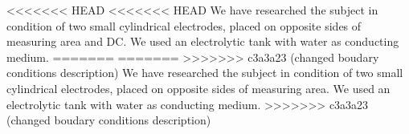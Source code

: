 \documentclass{article}
\begin{document}
<<<<<<< HEAD
<<<<<<< HEAD
We have researched the subject in condition of two small cylindrical electrodes, placed on opposite sides of measuring area and DC. We used an electrolytic tank with water as conducting medium.
=======
=======
>>>>>>> c3a3a23 (changed boudary conditions description)
We have researched the subject in condition of two small cylindrical electrodes, placed on opposite sides of measuring area. We used an electrolytic tank with water as conducting medium.
>>>>>>> c3a3a23 (changed boudary conditions description)





\end{document}
